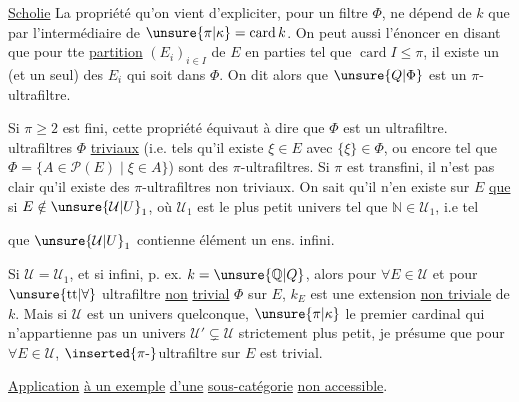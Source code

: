  \uline{Scholie} La propriété qu'on vient d'expliciter, pour un filtre $\Phi$, ne dépend  de $k$ que par l'intermédiaire de $\unsure{\pi|\kappa}=\operatorname{card}k$. On peut aussi l'énoncer en disant que pour tte \uline{partition} $(E_i)_{i\in I}$ de $E$ en  parties tel que $\operatorname{card}I\leq\pi$, il existe un (et un seul) des $E_i$ qui soit dans $\Phi$. On dit alors que $\unsure{Q|\Phi}$ est un $\pi$-ultrafiltre.

Si $\pi\geq 2$ est fini, cette propriété équivaut à dire que $\Phi$ est un ultrafiltre.   ultrafiltres $\Phi$ \uline{triviaux} \unsure{(}(i.e. tels qu'il existe $\xi\in E$ avec $\{\xi\}\in\Phi$, ou encore \deleted{\unsure{$\Phi$}} tel que $\Phi=\{A\in\mathcal P(E)\mid\xi\in A\}$) sont des $\pi$-ultrafiltres.  Si $\pi$ est transfini, il n'est pas clair qu'il existe des $\pi$-ultrafiltres non triviaux. On sait qu'il n'en existe sur $E$ \uline{que} si  $E\notin\unsure{\mathcal U|U}_1$, où $\mathcal U_1$ est le plus petit univers  tel que $\mathbb N\in\mathcal U_1$, i.e tel



que $\unsure{\mathcal U|U}_1$ contienne  élément un ens. infini.

Si $\mathcal U=\mathcal U_1$, et si   infini, p. ex. $k=\unsure{\mathbb Q|Q}$, alors pour   $\forall E\in\mathcal U$ et pour $\unsure{\mathrm{tt}|\forall}$ ultrafiltre \uline{non} \uline{trivial} $\Phi$ sur $E$, $k_E$ est une extension \uline{non triviale} de $k$. Mais si $\mathcal U$ est un univers quelconque,   $\unsure{\pi|\kappa}$ le premier cardinal   qui n'appartienne pas  un univers $\mathcal U'\subsetneq\mathcal U$ strictement plus petit, je présume que pour $\forall E\in\mathcal U$,  $\inserted{\pi\text{-}}$ultrafiltre sur $E$ est trivial.

\uline{Application} \uline{à un exemple} \uline{d'une} \uline{sous-catégorie} \uline{non accessible}.

